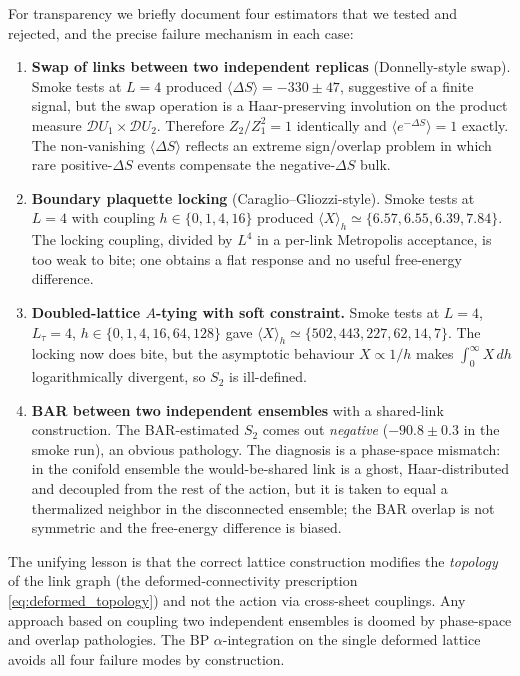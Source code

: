 \documentclass[aps,prl,reprint,superscriptaddress,floatfix,nofootinbib,amssymb]{revtex4-2}
\begin{document}
For transparency we briefly document four estimators that we tested and rejected, and the precise failure mechanism in each case:
\begin{enumerate}
\item[\textbf{(i)}] \textbf{Swap of links between two independent replicas} (Donnelly-style swap). Smoke tests at $L\!=\!4$ produced $\langle \Delta S\rangle=-330\pm 47$, suggestive of a finite signal, but the swap operation is a Haar-preserving involution on the product measure $\mathcal{D}U_1\times\mathcal{D}U_2$. Therefore $Z_2/Z_1^2=1$ identically and $\langle e^{-\Delta S}\rangle=1$ exactly. The non-vanishing $\langle\Delta S\rangle$ reflects an extreme sign/overlap problem in which rare positive-$\Delta S$ events compensate the negative-$\Delta S$ bulk.
\item[\textbf{(ii)}] \textbf{Boundary plaquette locking} (Caraglio--Gliozzi-style). Smoke tests at $L\!=\!4$ with coupling $h\in\{0,1,4,16\}$ produced $\langle X\rangle_h\simeq\{6.57,6.55,6.39,7.84\}$. The locking coupling, divided by $L^4$ in a per-link Metropolis acceptance, is too weak to bite; one obtains a flat response and no useful free-energy difference.
\item[\textbf{(iii)}] \textbf{Doubled-lattice $A$-tying with soft constraint.} Smoke tests at $L\!=\!4$, $L_\tau\!=\!4$, $h\in\{0,1,4,16,64,128\}$ gave $\langle X\rangle_h\simeq\{502,443,227,62,14,7\}$. The locking now does bite, but the asymptotic behaviour $X\propto 1/h$ makes $\int_0^\infty X\, dh$ logarithmically divergent, so $S_2$ is ill-defined.
\item[\textbf{(iv)}] \textbf{BAR between two independent ensembles} with a shared-link construction. The BAR-estimated $S_2$ comes out \emph{negative} ($-90.8\pm 0.3$ in the smoke run), an obvious pathology. The diagnosis is a phase-space mismatch: in the conifold ensemble the would-be-shared link is a ghost, Haar-distributed and decoupled from the rest of the action, but it is taken to equal a thermalized neighbor in the disconnected ensemble; the BAR overlap is not symmetric and the free-energy difference is biased.
\end{enumerate}

The unifying lesson is that the correct lattice construction modifies the \emph{topology} of the link graph (the deformed-connectivity prescription \eqref{eq:deformed_topology}) and not the action via cross-sheet couplings. Any approach based on coupling two independent ensembles is doomed by phase-space and overlap pathologies. The BP $\alpha$-integration on the single deformed lattice avoids all four failure modes by construction.
\end{document}
